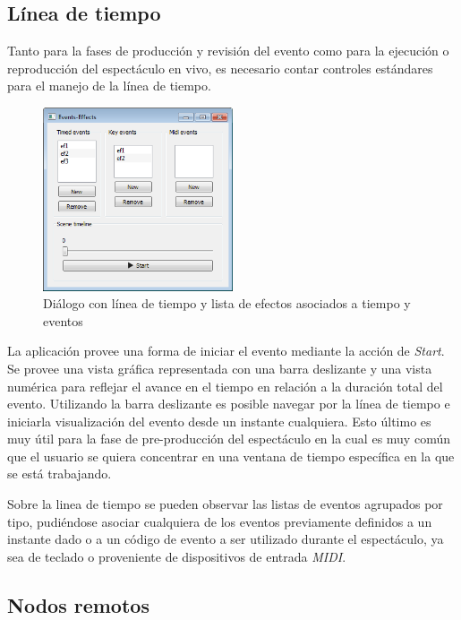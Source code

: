 \subsection{Línea de tiempo}

Tanto para la fases de producción y revisión del evento como para la ejecución o reproducción del espectáculo en vivo, es necesario contar controles estándares para el manejo de la línea de tiempo.

\begin{figure}[H]
  \centering
    \includegraphics[width=0.5\textwidth]{./Cap5_vmt/vmt_events_effects.png}
  \caption{Diálogo con línea de tiempo y lista de efectos asociados a tiempo y eventos}
  \label{fig:VMT-Timeline}
\end{figure}

La aplicación provee una forma de iniciar el evento mediante la acción de \emph{Start}. Se provee una vista gráfica representada con una barra deslizante y una vista numérica para reflejar el avance en el tiempo en relación a la duración total del evento. Utilizando la barra deslizante es posible navegar por la línea de tiempo e iniciarla visualización del evento desde un instante cualquiera. Esto último es muy útil para la fase de pre-producción del espectáculo en la cual es muy común que el usuario se quiera concentrar en una ventana de tiempo específica en la que se está trabajando.

Sobre la linea de tiempo se pueden observar las listas de eventos agrupados por tipo, pudiéndose asociar cualquiera de los eventos previamente definidos a un instante dado o a un código de evento a ser utilizado durante el espectáculo, ya sea de teclado o proveniente de dispositivos de entrada \emph{MIDI}.

\subsection{Nodos remotos}

